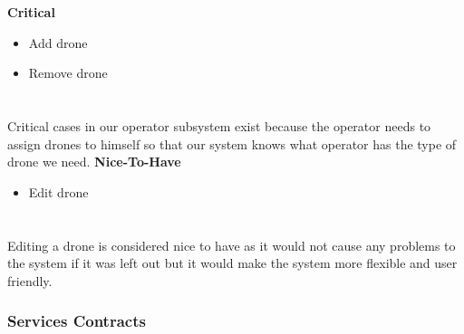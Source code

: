 \documentclass{article}
\begin{document}
		\begin{flushleft}
			\textbf{Critical}
				\begin{itemize}
	  				\item Add drone
	  				\item Remove drone
				\end{itemize}
			\section{}
			Critical cases in our operator subsystem exist because the operator needs to assign drones to himself so that our system knows what operator has the type of drone we need.
			\textbf{Nice-To-Have}
				\begin{itemize}
	  				\item Edit drone
				\end{itemize}
			\section{}
			Editing a drone is considered nice to have as it would not cause any problems to the system if it was left out but it would make the system more flexible and user friendly.
		\end{flushleft}

	\subsubsection{Services Contracts}
\end{document}
